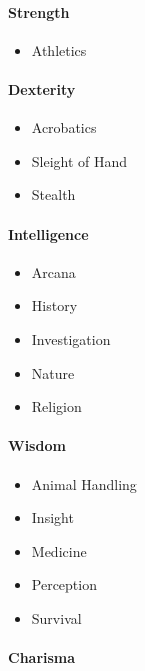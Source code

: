 \documentclass[
]{article}
\providecommand{\tightlist}{%
  \setlength{\itemsep}{0pt}\setlength{\parskip}{0pt}}
\begin{document}
\hypertarget{strength}{%
\paragraph{Strength}\label{strength}}

\begin{itemize}
\tightlist
\item
  Athletics
\end{itemize}

\hypertarget{dexterity}{%
\paragraph{Dexterity}\label{dexterity}}

\begin{itemize}
\tightlist
\item
  Acrobatics
\item
  Sleight of Hand
\item
  Stealth
\end{itemize}

\hypertarget{intelligence}{%
\paragraph{Intelligence}\label{intelligence}}

\begin{itemize}
\tightlist
\item
  Arcana
\item
  History
\item
  Investigation
\item
  Nature
\item
  Religion
\end{itemize}

\hypertarget{wisdom}{%
\paragraph{Wisdom}\label{wisdom}}

\begin{itemize}
\tightlist
\item
  Animal Handling
\item
  Insight
\item
  Medicine
\item
  Perception
\item
  Survival
\end{itemize}

\hypertarget{charisma}{%
\paragraph{Charisma}\label{charisma}}
\end{document}
